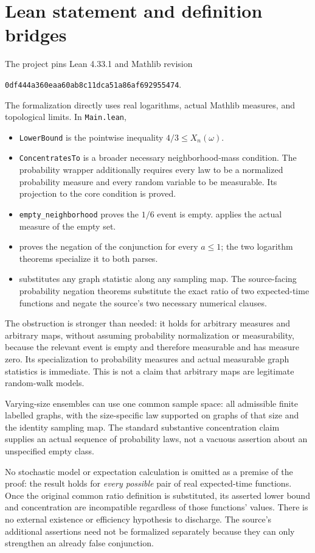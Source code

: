 \documentclass[11pt]{article}
\begin{document}
\section{Lean statement and definition bridges}
The project pins Lean 4.33.1 and Mathlib revision
\begin{center}\small\texttt{0df444a360eaa60ab8c11dca51a86af692955474}.\end{center}
The formalization directly uses real logarithms, actual Mathlib measures, and topological limits. In \texttt{Main.lean},
\begin{itemize}
 \item \texttt{LowerBound} is the pointwise inequality $4/3\leq X_n(\omega)$.
 \item \texttt{ConcentratesTo} is a broader necessary neighborhood-mass condition. The probability wrapper additionally requires every law to be a normalized probability measure and every random variable to be measurable. Its projection to the core condition is proved.
 \item \texttt{empty\_neighborhood} proves the $1/6$ event is empty.  applies the actual measure of the empty set.
 \item {} proves the negation of the conjunction for every $a\leq1$; the two logarithm theorems specialize it to both parses.
 \item {} substitutes any graph statistic along any sampling map. The source-facing probability negation theorems substitute the exact ratio of two expected-time functions and negate the source's two necessary numerical clauses.
\end{itemize}
The obstruction is stronger than needed: it holds for arbitrary measures and arbitrary maps, without assuming probability normalization or measurability, because the relevant event is empty and therefore measurable and has measure zero. Its specialization to probability measures and actual measurable graph statistics is immediate. This is not a claim that arbitrary maps are legitimate random-walk models.

Varying-size ensembles can use one common sample space: all admissible finite labelled graphs, with the size-specific law supported on graphs of that size and the identity sampling map. The standard substantive concentration claim supplies an actual sequence of probability laws, not a vacuous assertion about an unspecified empty class.\par
No stochastic model or expectation calculation is omitted as a premise of the proof: the result holds for \emph{every possible} pair of real expected-time functions. Once the original common ratio definition is substituted, its asserted lower bound and concentration are incompatible regardless of those functions' values. There is no external existence or efficiency hypothesis to discharge. The source's additional assertions need not be formalized separately because they can only strengthen an already false conjunction.
\end{document}

